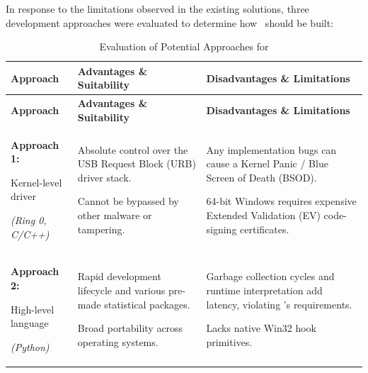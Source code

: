In response to the limitations observed in the existing solutions, three development approaches were evaluated to determine how \projectNameFormatted\ should be built:

{\small
\renewcommand{\arraystretch}{1.25}
\begin{xltabular}{\textwidth}{@{} P{3.2cm} L L @{}}
	\caption{Evaluation of Potential Approaches for \projectNameFormatted} \label{tab:approaches_eval} \\
	\toprule
	\textbf{Approach} & \textbf{Advantages \& Suitability} & \textbf{Disadvantages \& Limitations} \\
	\midrule
	\endfirsthead

	\toprule
	\textbf{Approach} & \textbf{Advantages \& Suitability} & \textbf{Disadvantages \& Limitations} \\
	\midrule
	\endhead


	\textbf{Approach 1:}\par Kernel-level driver\par\textit{\footnotesize (Ring 0, C/C++)} &
	\begin{tablelist}
		\item Absolute control over the USB Request Block (URB) driver stack.
		\item Cannot be bypassed by other malware or tampering.
	\end{tablelist} &
	\begin{tablelist}
		\item Any implementation bugs can cause a Kernel Panic / Blue Screen of Death (BSOD).
		\item 64-bit Windows requires expensive Extended Validation (EV) code-signing certificates.
	\end{tablelist} \\

	\textbf{Approach 2:}\par High-level language\par\textit{\footnotesize (Python)} &
	\begin{tablelist}
		\item Rapid development lifecycle and various pre-made statistical packages.
		\item Broad portability across operating systems.
	\end{tablelist} &
	\begin{tablelist}
		\item Garbage collection cycles and runtime interpretation add latency, violating \stakeholdersPU's requirements.
		\item Lacks native Win32 hook primitives.
	\end{tablelist} \\


\end{xltabular}}
